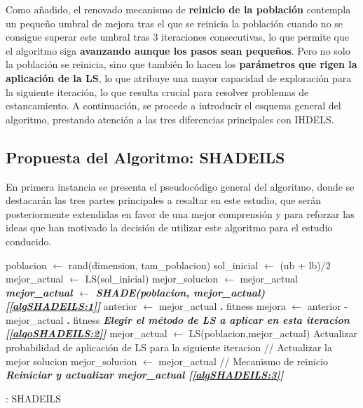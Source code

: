 Como añadido, el renovado mecanismo de \textbf{reinicio de la población} contempla un pequeño umbral de mejora tras el que se reinicia la población cuando no se consigue superar este umbral tras 3 iteraciones consecutivas, lo que permite que el algoritmo siga \textbf{avanzando aunque los pasos sean pequeños}. Pero no solo la población se reinicia, sino que también lo hacen los \textbf{parámetros que rigen la aplicación de la LS}, lo que atribuye una mayor capacidad de exploración para la siguiente iteración, lo que resulta crucial para resolver problemas de estancamiento. A continuación, se procede a introducir el esquema general del algoritmo, prestando atención a las tres diferencias principales con IHDELS.

\subsection{Propuesta del Algoritmo: SHADEILS}

En primera instancia se presenta el pseudocódigo general del algoritmo, donde se destacarán las tres partes principales a resaltar en este estudio, que serán posteriormente extendidas en favor de una mejor comprensión y para reforzar las ideas que han motivado la decisión de utilizar este algoritmo para el estudio conducido.

\begin{algorithm}[H]
	\begin{algorithmic}[1]
		\STATE poblacion $\leftarrow$ rand(dimension, tam\_poblacion)
		\STATE sol\_inicial  $\leftarrow$ (ub + lb)/2
		\STATE mejor\_actual $\leftarrow$ LS(sol\_inicial)
		\STATE mejor\_solucion $\leftarrow$ mejor\_actual
			\STATE \textit{\textbf{mejor\_actual $\leftarrow$ SHADE(poblacion, mejor\_actual) [\ref{algSHADEILS:1}]}}
			\STATE anterior $\leftarrow$ mejor\_actual \textbf{.} fitness 
			\STATE mejora $\leftarrow$ anterior - mejor\_actual \textbf{.} fitness
			\STATE \textit{\textbf{Elegir el método de LS a aplicar en esta iteracion [\ref{algoSHADEILS:2}]}}
			\STATE mejor\_actual $\leftarrow$ LS(poblacion,mejor\_actual)
			\STATE Actualizar probabilidad de aplicación de LS para la siguiente iteracion
			\STATE // Actualizar la mejor solucion
				\STATE mejor\_solucion $\leftarrow$ mejor\_actual
			\ENDIF
			\STATE // Mecanismo de reinicio
				\STATE \textit{\textbf{Reiniciar y actualizar mejor\_actual [\ref{algSHADEILS:3}]}}
			\ENDIF
			
		\ENDWHILE
		
	\end{algorithmic}
	\caption{: SHADEILS} \label{Alg: SHADEILS}
\end{algorithm}

